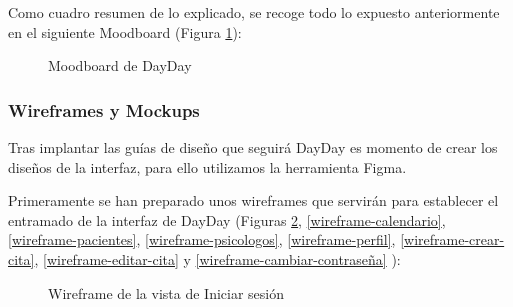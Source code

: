 Como cuadro resumen de lo explicado, se recoge todo lo expuesto anteriormente en el siguiente Moodboard (Figura \ref{moodboard}):

\begin{figure}[H]
    \caption{Moodboard de DayDay}
    \label{moodboard}
\end{figure}

\subsubsection{Wireframes y Mockups} \label{mockup-wirefram}
Tras implantar las guías de diseño que seguirá DayDay es momento de crear los diseños de la interfaz, para ello utilizamos la herramienta Figma.

Primeramente se han preparado unos wireframes que servirán para establecer el entramado de la interfaz de DayDay (Figuras \ref{wireframe-login}, \ref{wireframe-calendario}, \ref{wireframe-pacientes}, \ref{wireframe-psicologos}, \ref{wireframe-perfil}, \ref{wireframe-crear-cita}, \ref{wireframe-editar-cita} y \ref{wireframe-cambiar-contraseña} ):

\begin{figure}[H]
    \caption{Wireframe de la vista de Iniciar sesión}
    \label{wireframe-login}
\end{figure}

